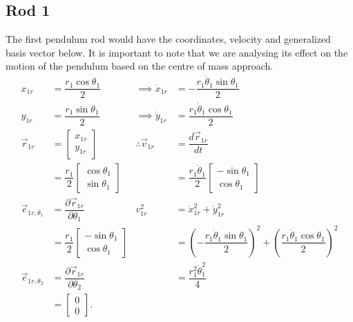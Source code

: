\documentclass[12pt,a4paper,portrait]{article}
\begin{document}
	\subsection{Rod 1}
	The first pendulum rod would have the coordinates, velocity and generalized basis vector below. It is important to note that we are analysing its effect on the motion of the pendulum based on the centre of mass approach. 
	\begin{align*}
		x_{1r} &= \dfrac{r_1\cos{\theta_1}}{2} &\implies \dot{x}_{1r} &= -\dfrac{r_1\dot{\theta}_1\sin{\theta_1}}{2}\\
		y_{1r} &= \dfrac{r_1\sin{\theta_1}}{2} &\implies \dot{y}_{1r} &= \dfrac{r_1\dot{\theta}_1\cos{\theta_1}}{2}\\
		\vec{r}_{1r} &= \begin{bmatrix}
			x_{1r} \\
			y_{1r}
		\end{bmatrix} &\therefore \vec{v}_{1r} &= \dfrac{d\vec{r}_{1r}}{dt} \\
		&= \dfrac{r_1}{2}\begin{bmatrix}
			\cos{\theta_1}\\
			\sin{\theta_1}
		\end{bmatrix} & &= \dfrac{r_1\dot{\theta}_1}{2} \begin{bmatrix}
			-\sin{\theta_1}\\
			\cos{\theta_1}
		\end{bmatrix} \\
		\vec{e}_{1r,\theta_1} &= \dfrac{\partial \vec{r}_{1r}}{\partial \theta_1} & v_{1r}^2 &= \dot{x}_{1r}^2 + \dot{y}_{1r}^2 \\
		&= \dfrac{r_1}{2} \begin{bmatrix}
			-\sin{\theta_1}\\
			\cos{\theta_1}
		\end{bmatrix} & &= \left(-\dfrac{r_1\dot{\theta}_1 \sin{\theta_1}}{2}\right)^2 + \left(\dfrac{r_1 \dot{\theta}_1 \cos{\theta_1}}{2}\right)^2 \\
	\vec{e}_{1r,\theta_2} &= \dfrac{\partial \vec{r}_{1r}}{\partial \theta_2} &&= \dfrac{r_1^2 \dot{\theta}_1^2}{4} \\
	&= \begin{bmatrix}
		0 \\
		0
	\end{bmatrix}.
	\end{align*}
	
\end{document}
